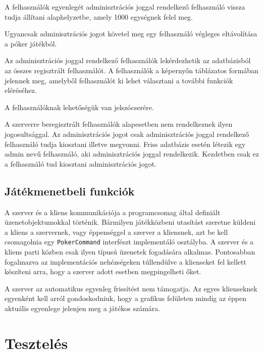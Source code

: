 A felhasználók egyenlegét adminisztrációs joggal rendelkező felhasználó vissza tudja állítani alaphelyzetbe, amely 1000 egységnek felel meg.

Ugyancsak adminisztrációs jogot követel meg egy felhasználó végleges eltávolítása a póker játékból.

Az adminisztrációs joggal rendelkező felhasználók lekérdezhetik az adatbázisból az összes regisztrált felhasználót. A felhasználók a képernyőn táblázatos formában jelennek meg, amelyből felhasználót ki lehet választani a további funkciók eléréséhez.

A felhasználóknak lehetőségük van jelszócserére.

A szerverre beregisztrált felhasználók alapesetben nem rendelkeznek ilyen jogosultsággal. Az adminisztrációs jogot csak adminisztrációs joggal rendelkező felhasználó tudja kiosztani illetve megvonni. Friss adatbázis esetén létezik egy admin nevű felhasználó, aki adminisztrációs joggal rendelkezik. Kezdetben csak ez a felhasználó tud kiosztani adminisztrációs jogot.

\subsection{Játékmenetbeli funkciók}
A szerver és a kliens kommunikációja a programcsomag által definiált üzenetobjektumokkal történik. Bármilyen játékközbeni utasítást szeretne küldeni a kliens a szervernek, vagy éppenséggel a szerver a kliensnek, azt be kell csomagolnia egy \texttt{PokerCommand} interfészt implementáló osztályba. A szerver és a kliens parti közben csak ilyen típusú üzenetek fogadására alkalmas. Pontosabban fogalmazva az implementációs nehézségeken túllendülve a klienseket fel kellett készíteni arra, hogy a szerver adott esetben megpingelheti őket.

A szerver az automatikus egyenleg frissítést nem támogatja. Az egyes klienseknek egyenként kell arról gondoskodniuk, hogy a grafikus felületen mindig az éppen aktuális egyenlege jelenjen meg a játékos számára.

\section{Tesztelés}
